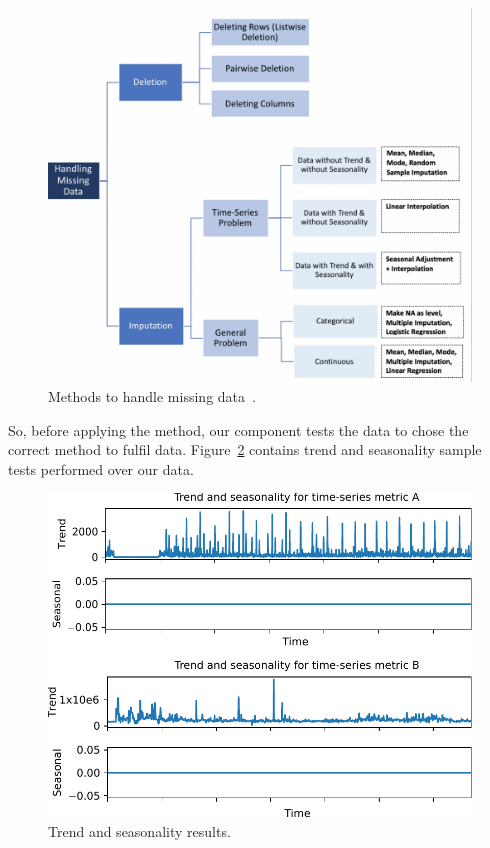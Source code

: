 \begin{figure}
    \centering\includegraphics[width=0.8\linewidth]{images/methods_to_fulfil_time_series_data.pdf}
    \caption{Methods to handle missing data~\cite{Swalin2019}.}
    \label{fig:methods_to_fulfil_time_series_data}
\end{figure}

So, before applying the method, our component tests the data to chose the correct method to fulfil data. Figure~\ref{fig:trend_seasonality_results} contains trend and seasonality sample tests performed over our data.

\begin{figure}
    \centering\includegraphics[width=0.8\linewidth]{images/trend_seasonality_results.pdf}
    \caption{Trend and seasonality results.}
    \label{fig:trend_seasonality_results}
\end{figure}

